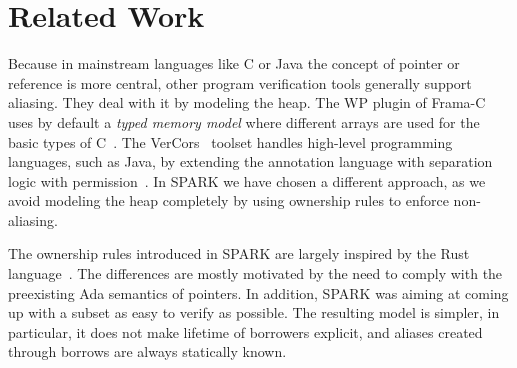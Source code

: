 \documentclass[runningheads]{llncs}
\begin{document}

\section{Related Work}
Because in mainstream languages like C or Java the concept of pointer or reference is more central, other program verification tools generally support aliasing. They deal with it by modeling the heap. The WP plugin of Frama-C uses by default a \emph{typed memory model} where different arrays are used for the basic types of C~\cite{kirchner2015frama}. The VerCors~\cite{blom2017vercors} toolset handles high-level programming languages, such as Java, by extending the annotation language with separation logic with permission~\cite{reynolds2002separation}. In SPARK we have chosen a different approach, as we avoid modeling the heap completely by using ownership rules to enforce non-aliasing.

The ownership rules introduced in SPARK are largely inspired by the Rust language~\cite{rust}. The differences are mostly motivated by the need to comply with the preexisting Ada semantics of pointers. In addition, SPARK was aiming at coming up with a subset as easy to verify as possible. The resulting model is simpler, in particular, it does not make lifetime of borrowers explicit, and aliases created through borrows are always statically known. %
\end{document}

